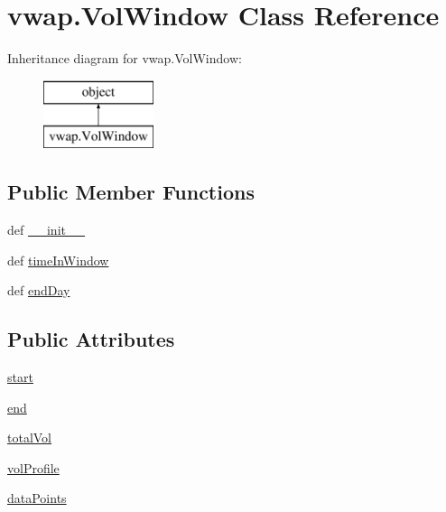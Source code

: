 \hypertarget{classvwap_1_1_vol_window}{\section{vwap.\-Vol\-Window Class Reference}
\label{classvwap_1_1_vol_window}
}
Inheritance diagram for vwap.\-Vol\-Window\-:\begin{figure}[H]
\begin{center}
\leavevmode
\includegraphics[height=2.000000cm]{classvwap_1_1_vol_window}
\end{center}
\end{figure}
\subsection*{Public Member Functions}
\begin{DoxyCompactItemize}
\item 
def \hyperlink{classvwap_1_1_vol_window_a2791d2100fcaeb77ab3688843b35b590}{\-\_\-\-\_\-init\-\_\-\-\_\-}
\item 
def \hyperlink{classvwap_1_1_vol_window_a02d5bf7f133ebcf481ad0b417e0f3255}{time\-In\-Window}
\item 
def \hyperlink{classvwap_1_1_vol_window_a1f45ad6c33045a67902a669d2242fc07}{end\-Day}
\end{DoxyCompactItemize}
\subsection*{Public Attributes}
\begin{DoxyCompactItemize}
\item 
\hyperlink{classvwap_1_1_vol_window_af63dc745bd026d49ab883a10d03217df}{start}
\item 
\hyperlink{classvwap_1_1_vol_window_af5b1f122cb50eddb5b1326184b8e7bbf}{end}
\item 
\hyperlink{classvwap_1_1_vol_window_a3d92ce21ab2a267623ebb178363c8b3d}{total\-Vol}
\item 
\hyperlink{classvwap_1_1_vol_window_aedf3b292d8ee0df50e48e9bda5cb5c34}{vol\-Profile}
\item 
\hyperlink{classvwap_1_1_vol_window_a6cab681b9d345ee2aeea8b96fb567cd4}{data\-Points}
\end{DoxyCompactItemize}


